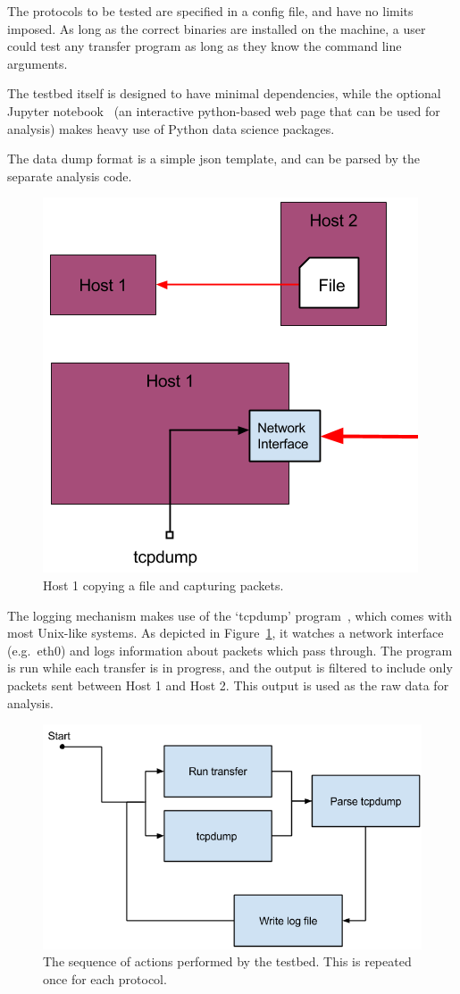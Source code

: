 \documentclass{sig-alternate-05-2015}
\begin{document}
The protocols to be tested are specified in a config file, and have no limits imposed. As long as the correct binaries are installed on the machine, a user could test any transfer program as long as they know the command line arguments.

The testbed itself is designed to have minimal dependencies, while the optional Jupyter notebook~\cite{jupyter} (an interactive python-based web page that can be used for analysis) makes heavy use of Python data science packages.

The data dump format is a simple json template, and can be parsed by the separate analysis code.

\begin{figure}[h]
\centering
	\includegraphics[width=.6\linewidth]{img/transfer_example.png}
\caption{Host 1 copying a file and capturing packets.\label{fig:copy_example}}
\end{figure}
The logging mechanism makes use of the `tcpdump' program~\cite{tcpdump}, which comes with most Unix-like systems. As depicted in Figure~\ref{fig:copy_example}, it watches a network interface (e.g.\ eth0) and logs information about packets which pass through. The program is run while each transfer is in progress, and the output is filtered to include only packets sent between Host 1 and Host 2. This output is used as the raw data for analysis.

\begin{figure}[h]
\centering
	\includegraphics[width=.8\linewidth]{img/loop}
\caption{The sequence of actions performed by the testbed. This is repeated once for each protocol.\label{fig:testbed_sequence}}
\end{figure}
\end{document}
